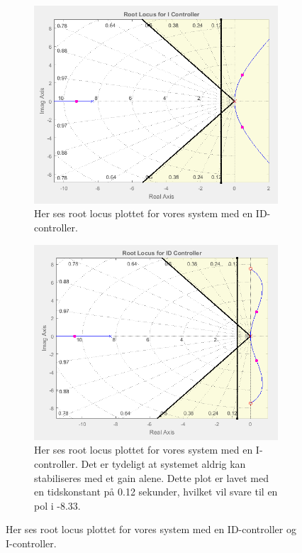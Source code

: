 \begin{figure}[t!]
    \centering
    \begin{subfigure}[t]{0.49\textwidth}
     \centering
        \includegraphics[width=1\textwidth]{Billeder/I_rlocus.PNG}
        \caption{Her ses root locus plottet for vores system med en ID-controller.}
        \label{fig:I_rlocus}
    \end{subfigure}
    \begin{subfigure}[t]{0.49\textwidth}
     \centering
        \includegraphics[width=1\textwidth]{Billeder/ID_rlocus.PNG}
        \caption{Her ses root locus plottet for vores system med en I-controller. Det er tydeligt at systemet aldrig kan stabiliseres med et gain alene. Dette plot er lavet med en tidskonstant på 0.12 sekunder, hvilket vil svare til en pol i -8.33.}
        \label{fig:ID_rlocus}
    \end{subfigure}
    \caption{Her ses root locus plottet for vores system med en ID-controller og I-controller.}
\end{figure}

